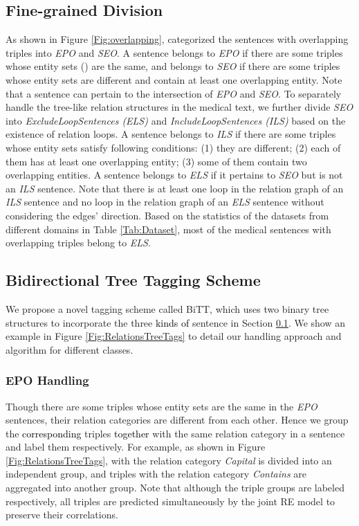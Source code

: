 \documentclass[conference]{IEEEtran}
\newcommand{\yankun}[1]{\textcolor{black}{#1}}
\begin{document}
\subsection{Fine-grained Division}
\label{ssec:Division}
As shown in Figure \ref{Fig:overlapping}, \cite{Zeng2018Extracting} categorized the sentences with overlapping triples into \emph{EPO} and \emph{SEO}. A sentence belongs to \emph{EPO} if there are some triples whose entity sets () are the same, and belongs to \emph{SEO} if there are some triples whose entity sets are different and contain at least one overlapping entity. Note that a sentence can pertain to the intersection of \emph{EPO} and \emph{SEO}. To separately handle the tree-like relation structures in the medical text, we further divide \emph{SEO} into \emph{ExcludeLoopSentences (ELS)} and \emph{IncludeLoopSentences (ILS)} based on the existence of relation loops. A sentence belongs to \emph{ILS} if there are some triples whose entity sets satisfy following conditions: (1) they are different; (2) each of them has at least one overlapping entity; (3) some of them contain two overlapping entities. A sentence belongs to \emph{ELS} if it pertains to \emph{SEO} but is not an \emph{ILS} sentence. Note that there is at least one loop in the relation graph of an \emph{ILS} sentence and no loop in the relation graph of an \emph{ELS} sentence without considering the edges' direction. Based on the statistics of the datasets from different domains in Table \ref{Tab:Dataset}, most of the medical sentences with overlapping triples belong to \emph{ELS}.


\subsection{Bidirectional Tree Tagging Scheme}
\label{ssec:BiTTScheme}
We propose a novel tagging scheme called BiTT, which uses two binary tree structures to incorporate the three \yankun{kinds of} sentence 
in Section \ref{ssec:Division}. We show an example in Figure \ref{Fig:RelationsTreeTags} to detail our handling approach and algorithm for different classes.

\subsubsection{EPO Handling}
\label{sssect:EPO}
Though there are some triples whose entity sets are the same in the \emph{EPO} sentences, their relation categories are different from each other. Hence we group 
the \yankun{corresponding} triples \yankun{together} with the same relation category in a sentence and label them respectively. For example, as shown in Figure \ref{Fig:RelationsTreeTags},  with the relation category \emph{Capital} is divided into an independent group, and 
triples with the relation category \emph{Contains} are aggregated into another group. Note that although the triple groups are labeled respectively, all triples are predicted simultaneously by the joint RE model to preserve their correlations.
\end{document}
